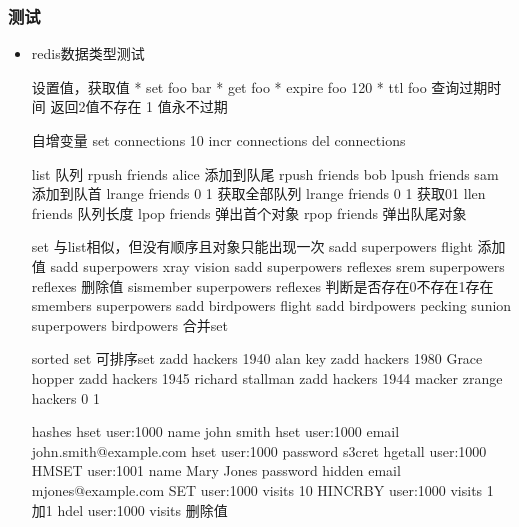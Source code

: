 \documentclass[a4paper,10pt,english]{sphinxmanual}
\begin{document}
\subsubsection{测试}
\label{\detokenize{program/redis:id3}}\begin{itemize}
\item {} 
redis数据类型测试

\begin{sphinxVerbatim}[commandchars=\\\{\}]
设置值，获取值
* set foo \PYGZdq{}bar\PYGZdq{}
* get foo
* expire foo 120
* ttl foo 查询过期时间 返回\PYGZhy{}2值不存在 \PYGZhy{}1 值永不过期

自增变量
set connections 10
incr connections
del connections

list 队列
rpush friends \PYGZdq{}alice\PYGZdq{} 添加到队尾
rpush friends \PYGZdq{}bob\PYGZdq{}
lpush friends \PYGZdq{}sam\PYGZdq{} 添加到队首
lrange friends 0 \PYGZhy{}1 获取全部队列
lrange friends 0 1 获取0\PYGZhy{}1
llen friends 队列长度
lpop friends 弹出首个对象
rpop friends 弹出队尾对象

set 与list相似，但没有顺序且对象只能出现一次
sadd superpowers \PYGZdq{}flight\PYGZdq{}   添加值
sadd superpowers \PYGZdq{}x\PYGZhy{}ray vision\PYGZdq{}
sadd superpowers \PYGZdq{}reflexes\PYGZdq{}
srem superpowers \PYGZdq{}reflexes\PYGZdq{}  删除值
sismember superpowers \PYGZdq{}reflexes\PYGZdq{}  判断是否存在0不存在1存在
smembers superpowers
sadd birdpowers \PYGZdq{}flight\PYGZdq{}
sadd birdpowers \PYGZdq{}pecking\PYGZdq{}
sunion superpowers birdpowers 合并set

sorted set 可排序set
zadd hackers 1940 \PYGZdq{}alan key\PYGZdq{}
zadd hackers 1980 \PYGZdq{}Grace hopper\PYGZdq{}
zadd hackers 1945 \PYGZdq{}richard stallman\PYGZdq{}
zadd hackers 1944 \PYGZdq{}macker\PYGZdq{}
zrange hackers 0 \PYGZhy{}1

hashes
hset user:1000 name \PYGZdq{}john smith\PYGZdq{}
hset user:1000 email \PYGZdq{}john.smith@example.com\PYGZdq{}
hset user:1000 password \PYGZdq{}s3cret\PYGZdq{}
hgetall user:1000
HMSET user:1001 name \PYGZdq{}Mary Jones\PYGZdq{} password \PYGZdq{}hidden\PYGZdq{} email \PYGZdq{}mjones@example.com\PYGZdq{}
SET user:1000 visits 10
HINCRBY user:1000 visits 1 加1
hdel user:1000 visits 删除值
\end{sphinxVerbatim}

\end{itemize}
\end{document}
